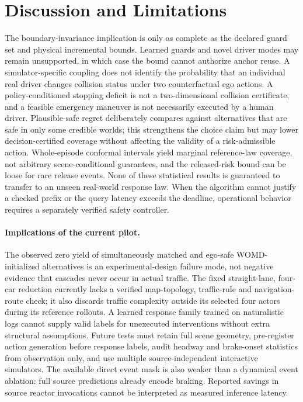 \documentclass[10pt]{article}
\begin{document}
\section{Discussion and Limitations}
\label{sec:limits}
The boundary-invariance implication is only as complete as the declared guard set and physical incremental bounds. Learned guards and novel driver modes may remain unsupported, in which case the bound cannot authorize anchor reuse. A simulator-specific coupling does not identify the probability that an individual real driver changes collision status under two counterfactual ego actions. A policy-conditioned stopping deficit is not a two-dimensional collision certificate, and a feasible emergency maneuver is not necessarily executed by a human driver. Plausible-safe regret deliberately compares against alternatives that are safe in only some credible worlds; this strengthens the choice claim but may lower decision-certified coverage without affecting the validity of a risk-admissible action. Whole-episode conformal intervals yield marginal reference-law coverage, not arbitrary scene-conditional guarantees, and the released-risk bound can be loose for rare release events. None of these statistical results is guaranteed to transfer to an unseen real-world response law. When the algorithm cannot justify a checked prefix or the query latency exceeds the deadline, operational behavior requires a separately verified safety controller.

\paragraph{Implications of the current pilot.}
The observed zero yield of simultaneously matched and ego-safe
WOMD-initialized alternatives is an experimental-design failure mode, not
negative evidence that cascades never occur in actual traffic. The fixed
straight-lane, four-car reduction currently lacks a verified map-topology,
traffic-rule and navigation-route check; it also discards traffic complexity
outside its selected four actors during its reference rollouts. A learned
response family trained on naturalistic logs cannot supply valid labels for
unexecuted interventions without extra structural assumptions. Future tests
must retain full scene geometry, pre-register action generation before
response labels, audit headway and brake-onset statistics from observation
only, and use multiple source-independent interactive simulators. The
available direct event mask is also weaker than a dynamical event ablation:
full source predictions already encode braking. Reported savings in source
reactor invocations cannot be interpreted as measured inference latency.
\end{document}
